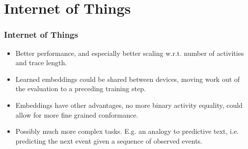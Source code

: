 \documentclass{beamer}
\begin{document}
	\section{Internet of Things}
	\begin{frame}
		\frametitle{Internet of Things}
		\begin{itemize}
			\item Better performance, and especially better scaling w.r.t. number of activities and trace length.
			\item Learned embeddings could be shared between devices, moving work out of the evaluation to a preceding training step.
			\item Embeddings have other advantages, no more binary activity equality, could allow for more fine grained conformance.
			\item Possibly much more complex tasks. E.g. an analogy to predictive text, i.e. predicting the next event given a sequence of observed events.
		\end{itemize}
	\end{frame}
	
\end{document}
